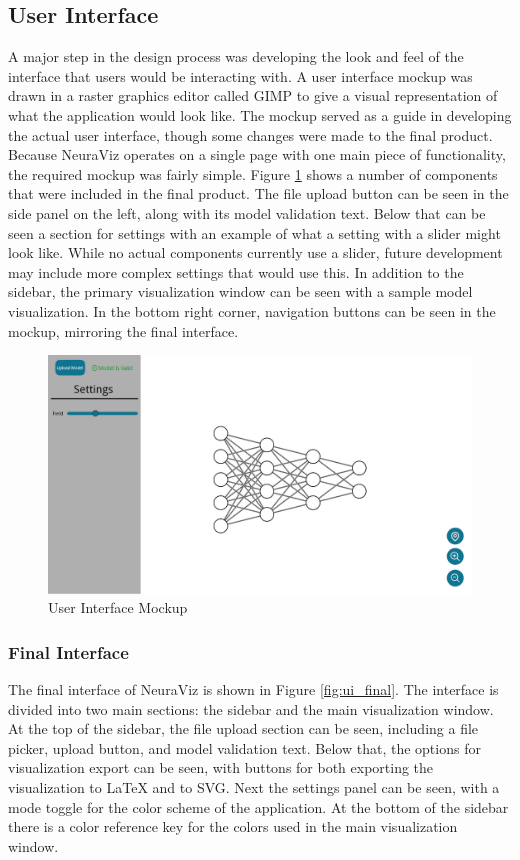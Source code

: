 \subsection{User Interface}
A major step in the design process was developing the look and feel of the interface that users would be interacting with. A user interface mockup was drawn in a raster graphics editor called GIMP \cite{gimp} to give a visual representation of what the application would look like. The mockup served as a guide in developing the actual user interface, though some changes were made to the final product. Because NeuraViz operates on a single page with one main piece of functionality, the required mockup was fairly simple. Figure \ref{fig:ui_mockup} shows a number of components that were included in the final product. The file upload button can be seen in the side panel on the left, along with its model validation text. Below that can be seen a section for settings with an example of what a setting with a slider might look like. While no actual components currently use a slider, future development may include more complex settings that would use this. In addition to the sidebar, the primary visualization window can be seen with a sample model visualization. In the bottom right corner, navigation buttons can be seen in the mockup, mirroring the final interface.

\begin{figure}[ht]
    \centering
    \includegraphics[width=1\textwidth]{../docs/mockups/Main_Light.png}
    \caption{User Interface Mockup}
    \label{fig:ui_mockup}
\end{figure}

\subsubsection{Final Interface}
The final interface of NeuraViz is shown in Figure \ref{fig:ui_final}. The interface is divided into two main sections: the sidebar and the main visualization window. At the top of the sidebar, the file upload section can be seen, including a file picker, upload button, and model validation text. Below that, the options for visualization export can be seen, with buttons for both exporting the visualization to \LaTeX{} and to SVG. Next the settings panel can be seen, with a mode toggle for the color scheme of the application. At the bottom of the sidebar there is a color reference key for the colors used in the main visualization window. 

